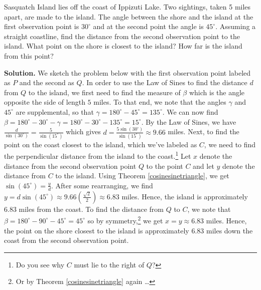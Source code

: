 \begin{ex} \label{losapplication}  Sasquatch Island lies off the coast of Ippizuti Lake.  Two sightings, taken 5 miles apart, are made to the island.  The angle between the shore and the island at the first observation point is $30^{\circ}$ and at the second point the angle is $45^{\circ}$.  Assuming a straight coastline, find the distance from the second observation point to the island.  What point on the shore is closest to the island? How far is the island from this point?  

\smallskip

{\bf Solution.}  We sketch the problem below with the first observation point labeled as $P$ and the second as $Q$. In order to use the Law of Sines to find the distance $d$ from $Q$ to the island, we first need to find the measure of $\beta$ which is the angle opposite the side of length $5$ miles.  To that end, we note that the angles $\gamma$ and $45^{\circ}$ are supplemental, so that $\gamma = 180^{\circ} - 45^{\circ} = 135^{\circ}$.  We can now find $\beta = 180^{\circ} - 30^{\circ} - \gamma =  180^{\circ} - 30^{\circ} - 135^{\circ} = 15^{\circ}$. By the Law of Sines, we have $\frac{d}{\sin\left(30^{\circ}\right)} = \frac{5}{\sin\left(15^{\circ}\right)}$ which gives $d = \frac{5\sin\left(30^{\circ}\right)}{\sin\left(15^{\circ}\right)} \approx 9.66$ miles.  Next, to find the point on the coast closest to the island, which we've labeled as $C$, we need to find the perpendicular distance from the island to the coast.\footnote{Do you see why $C$ must lie to the right of $Q$?} Let $x$ denote the distance from the second observation point $Q$ to the point $C$  and let $y$ denote the distance from $C$ to the island.  Using Theorem \ref{cosinesinetriangle}, we get $\sin\left(45^{\circ}\right) = \frac{y}{d}$.  After some rearranging, we find $y = d \sin\left(45^{\circ}\right) \approx 9.66 \left(\frac{\sqrt{2}}{2}\right) \approx 6.83$ miles.  Hence, the island is approximately $6.83$ miles from the coast. To find the distance from $Q$ to $C$, we note that $\beta = 180^{\circ} - 90^{\circ} - 45^{\circ} = 45^{\circ}$ so by symmetry,\footnote{Or by Theorem \ref{cosinesinetriangle} again \ldots} we get $x = y \approx 6.83$ miles.  Hence, the point on the shore closest to the island is approximately $6.83$ miles down the coast from the second observation point.


\end{ex}

